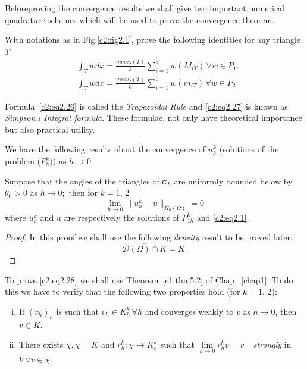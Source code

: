 Before\pageoriginale  proving the convergence results we shall give two important
numerical quadrature schemes which will be used to prove the
convergence theorem. 

\begin{exercise}\label{c2:exer2.3}%
With notations as in Fig.\ref{c2:fig2.1}, prove the following identities for any
triangle $T$ 
\begin{align}
&\int_T wdx = \frac{meas .(T)}{3} \sum\limits_{i=1}^{3} w(M_{iT})\,
  \forall w \in P_1.\tag{2.26}\label{c2:eq2.26}\\ 
&\int_T wdx = \frac{meas .(T)}{3} \sum\limits_{i=1}^{3} w(m_{iT})\,
  \forall w \in P_2.\tag{2.27}\label{c2:eq2.27} 
\end{align}
\end{exercise}
Formula~\eqref{c2:eq2.26} is called the \textit{Trapezoidal Rule} and
\eqref{c2:eq2.27} is known as \textit{Simpson's Integral formula}. These
formulae, not only have theoretical importance but also practical
utility.  

We have the following results about the convergence of $u^k_h$
(solutions of the problem ($P^k_h$)) as $h \to 0$. 

\begin{theorem}\label{c2:thm2.3}%
Suppose that the angles of the triangles of $\mathscr{C}_h$ are uniformly
bounded below by $\theta _0 > 0$ as $h \to 0;$ then for $k=1$, 2 
\begin{equation}
\lim_{h \to 0} \parallel  u^k_h - u \parallel  _{H^1 _0(\Omega)} = 0 
\tag{2.28}\label{c2:eq2.28} 
\end{equation}
where $u^k_h$ and $u$ are respectively the solutions of $P^k_{1h}$ and
\eqref{c2:eq2.1}. 
\end{theorem}  

\begin{proof}
In this proof we shall use the following \textit{density} result to be\break
proved later: 
\begin{equation}
\overline{\mathscr{D} (\Omega) \cap K} =
K. \tag{2.29}\label{c2:eq2.29} 
\end{equation}
\end{proof}
  
To prove \eqref{c2:eq2.28} we shall use Theorem~\ref{c1:thm5.2}  of 
Chap.~\ref{chap1}.  To do this we
have to verify  that the following two properties hold (for $k=1$, 2): 
  
\begin{enumerate}[(i)]
\item If $(v_h)_h$ is such that $v_h \in K^k_h\, \forall  h$ and
  converges weakly to $v$ as $h \to 0$, then $v \in K$. 
\item There exists $\chi, \overline{\chi} = K$ and $r^k_h : \chi \to
  K^k_h$ such that $\lim\limits_{h \to 0} r^k_{h}v = v$
  =\textit{strongly } in $V\, \forall  v \in \chi$.  
\end{enumerate}
 
